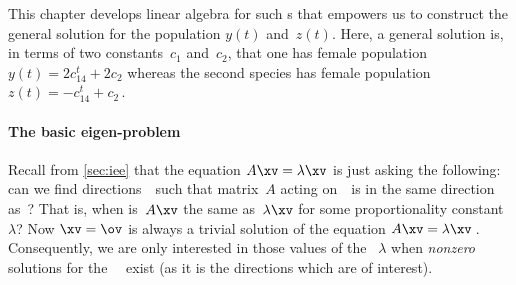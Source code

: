 This chapter develops linear algebra for such s that empowers us to construct the general solution for the population \(y(t)\) and~\(z(t)\). 
Here, a general solution is, in terms of two constants~\(c_1\) and~\(c_2\), that one  has female population \(y(t)=2c_14^t+2c_2\) whereas the second species has female population \(z(t)=-c_14^t+c_2\)\,.

%




\paragraph{The basic eigen-problem}
Recall from \cref{sec:iee} that the  equation \(A\xv=\lambda\xv\) is just asking the following: 
can we find directions~\xv\ such that matrix~\(A\) acting on~\xv\ is in the same direction as~\xv? 
That is, when is~\(A\xv\) the same as~\(\lambda\xv\) for some proportionality constant~\(\lambda\)?
Now \(\xv=\ov\) is always a trivial solution of the  equation \(A\xv=\lambda \xv\)\,.
Consequently, we are only interested in those values of the ~\(\lambda\) when \emph{nonzero} solutions for the ~\xv\ exist (as it is the directions which are of interest).

